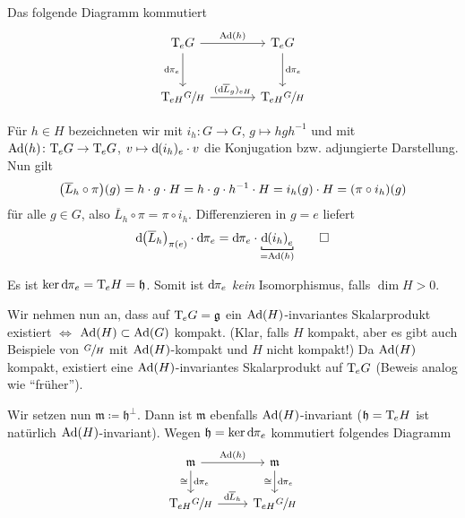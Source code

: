 \begin{lemma}
	Das folgende Diagramm kommutiert
	\[
		\begin{tikzcd}[sep=large]
			\Tmap_e G \rar["\Ad(h)"] \dar["\mathd \pi_e"'] & \Tmap_e G \dar["\mathd \pi_e"] \\
			\Tmap_{eH} \sfrac{G}{H} \rar["(\mathd \overline{L}_g)_{eH}"] & \Tmap_{eH} \sfrac{G}{H}
		\end{tikzcd}
	\]
\end{lemma}
\begin{beweis}
	Für $h \in H$ bezeichneten wir mit $i_h \colon G \to G$, $g \mapsto h g h^{-1}$ und mit $\operatorname{Ad}(h) \colon \mathrm{T}\mkern-0.85mu_e G \to \mathrm{T}\mkern-0.85mu_e G$, $v \mapsto \mathrm{d}\mkern-1.0mu (i_h)_e \cdot v$ die Konjugation bzw. adjungierte Darstellung.
	Nun gilt
	\begin{align}
		\enbrace*{\overline{L}_h \circ \pi} (g) = h \cdot g \cdot H = h \cdot g \cdot h^{-1} \cdot H = i_h(g) \cdot H = (\pi \circ i_h)(g)
	\end{align}
	für alle $g \in G$, also $\overline{L}_h \circ \pi = \pi \circ i_h$.
	Differenzieren in $g=e$ liefert
	\[
		\mathd \enbrace*{\overline{L}_h}_{\pi(e)} \cdot \mathd \pi_e = \mathd \pi_e \cdot \Underbracket{\mathd \enbrace*{i_h}_e}{= \Ad(h)} \qedhere
	\]
\end{beweis}

\begin{bemerkung*}
	Es ist $\ker \mathrm{d}\mkern-1.0mu \pi_e = \mathrm{T}\mkern-0.85mu_e H =\mathfrak{h}$.
	Somit ist $\mathrm{d}\mkern-1.0mu \pi_e$ \emph{kein} Isomorphismus, falls $\dim H > 0$.
\end{bemerkung*}

Wir nehmen nun an, dass auf $\mathrm{T}\mkern-0.85mu_e G = \mathfrak{g}$ ein $\operatorname{Ad}(H)$-invariantes Skalarprodukt existiert $\iff$ $\operatorname{Ad}(H) \subset \operatorname{Ad}(G)$ kompakt. (Klar, falls $H$ kompakt, aber es gibt auch Beispiele von $\sfrac{G}{H}$ mit $\operatorname{Ad}(H)$-kompakt und $H$ nicht kompakt!)
Da $\operatorname{Ad}(H)$ kompakt, existiert eine $\operatorname{Ad}(H)$-invariantes Skalarprodukt auf $\mathrm{T}\mkern-0.85mu_e G$ (Beweis analog wie \enquote{früher}).

Wir setzen nun $\mathfrak{m} \coloneqq \mathfrak{h}^\perp$.
Dann ist $\mathfrak{m}$ ebenfalls $\operatorname{Ad}(H)$-invariant ($\mathfrak{h} = \mathrm{T}\mkern-0.85mu_e H$ ist natürlich $\operatorname{Ad}(H)$-invariant). 
Wegen $\mathfrak{h} = \ker \mathrm{d}\mkern-1.0mu \pi_e$ kommutiert folgendes Diagramm
\[
	\begin{tikzcd}
		\mathfrak{m} \dar["\mathd \pi_e","\cong"'] \rar["\Ad(h)"] & \mathfrak{m} \dar["\mathd \pi_e","\cong"'] \\
		\Tmap_{eH} \sfrac{G}{H} \rar["\mathd \overline{L}_h"] & \Tmap_{eH} \sfrac{G}{H}
	\end{tikzcd}
\]

